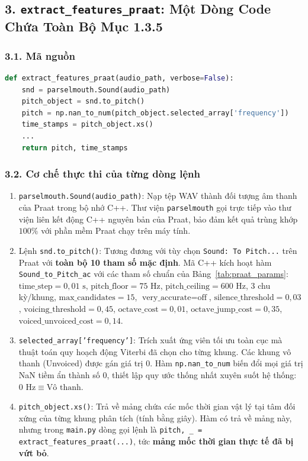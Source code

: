 \documentclass[11pt,a4paper]{article}
\begin{document}
\subsection*{3. \texttt{extract\_features\_praat}: Một Dòng Code Chứa Toàn Bộ Mục 1.3.5}

\subsubsection*{3.1. Mã nguồn}
\begin{lstlisting}[language=Python]
def extract_features_praat(audio_path, verbose=False):
    snd = parselmouth.Sound(audio_path)
    pitch_object = snd.to_pitch()
    pitch = np.nan_to_num(pitch_object.selected_array['frequency'])
    time_stamps = pitch_object.xs()
    ...
    return pitch, time_stamps
\end{lstlisting}

\subsubsection*{3.2. Cơ chế thực thi của từng dòng lệnh}
\begin{enumerate}
    \setlength{\itemsep}{1.5pt}
    \item \texttt{parselmouth.Sound(audio\_path)}: Nạp tệp WAV thành đối tượng âm thanh của Praat trong bộ nhớ C++. Thư viện \texttt{parselmouth} gọi trực tiếp vào thư viện liên kết động C++ nguyên bản của Praat, bảo đảm kết quả trùng khớp $100\%$ với phần mềm Praat chạy trên máy tính.
    \item Lệnh \texttt{snd.to\_pitch()}: Tương đương với tùy chọn \texttt{Sound: To Pitch...} trên Praat với \textbf{toàn bộ 10 tham số mặc định}. Mã C++ kích hoạt hàm \texttt{Sound\_to\_Pitch\_ac} với các tham số chuẩn của Bảng~\ref{tab:praat_params}: $\text{time\_step} = 0{,}01\text{ s}$, $\text{pitch\_floor} = 75\text{ Hz}$, $\text{pitch\_ceiling} = 600\text{ Hz}$, 3 chu kỳ/khung, $\text{max\_candidates} = 15$, $\text{very\_accurate} = \text{off}$, $\text{silence\_threshold} = 0{,}03$, $\text{voicing\_threshold} = 0{,}45$, $\text{octave\_cost} = 0{,}01$, $\text{octave\_jump\_cost} = 0{,}35$, $\text{voiced\_unvoiced\_cost} = 0{,}14$.
    \item \texttt{selected\_array['frequency']}: Trích xuất ứng viên tối ưu toàn cục mà thuật toán quy hoạch động Viterbi đã chọn cho từng khung. Các khung vô thanh (Unvoiced) được gán giá trị $0$. Hàm \texttt{np.nan\_to\_num} biến đổi mọi giá trị NaN tiềm ẩn thành số $0$, thiết lập quy ước thống nhất xuyên suốt hệ thống: \textbf{$0\text{ Hz} \equiv \text{Vô thanh}$}.
    \item \texttt{pitch\_object.xs()}: Trả về mảng chứa các mốc thời gian vật lý tại tâm đối xứng của từng khung phân tích (tính bằng giây). Hàm có trả về mảng này, nhưng trong \texttt{main.py} dòng gọi lệnh là \texttt{pitch, \_ = extract\_features\_praat(...)}, tức \textbf{mảng mốc thời gian thực tế đã bị vứt bỏ}.
\end{enumerate}
\end{document}
